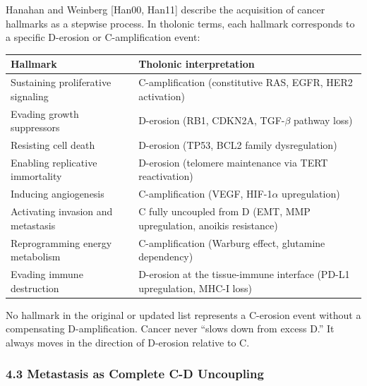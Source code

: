 \documentclass[
  11pt,
  letterpaper,
]{article}
\begin{document}
Hanahan and Weinberg {[}Han00, Han11{]} describe the acquisition of
cancer hallmarks as a stepwise process. In tholonic terms, each hallmark
corresponds to a specific D-erosion or C-amplification event:

\begin{longtable}[]{@{}
  >{\raggedright\arraybackslash}p{}
  >{\raggedright\arraybackslash}p{}@{}}
\toprule\noalign{}
\begin{minipage}[b]{\linewidth}\raggedright
Hallmark
\end{minipage} & \begin{minipage}[b]{\linewidth}\raggedright
Tholonic interpretation
\end{minipage} \\
\midrule\noalign{}
\endhead
\bottomrule\noalign{}
\endlastfoot
Sustaining proliferative signaling & C-amplification (constitutive RAS,
EGFR, HER2 activation) \\
Evading growth suppressors & D-erosion (RB1, CDKN2A, TGF-\(\beta\)
pathway loss) \\
Resisting cell death & D-erosion (TP53, BCL2 family dysregulation) \\
Enabling replicative immortality & D-erosion (telomere maintenance via
TERT reactivation) \\
Inducing angiogenesis & C-amplification (VEGF, HIF-1\(\alpha\)
upregulation) \\
Activating invasion and metastasis & C fully uncoupled from D (EMT, MMP
upregulation, anoikis resistance) \\
Reprogramming energy metabolism & C-amplification (Warburg effect,
glutamine dependency) \\
Evading immune destruction & D-erosion at the tissue-immune interface
(PD-L1 upregulation, MHC-I loss) \\
\end{longtable}

No hallmark in the original or updated list represents a C-erosion event
without a compensating D-amplification. Cancer never ``slows down from
excess D.'' It always moves in the direction of D-erosion relative to C.

\subsubsection{4.3 Metastasis as Complete C-D
Uncoupling}\label{metastasis-as-complete-c-d-uncoupling}
\end{document}
